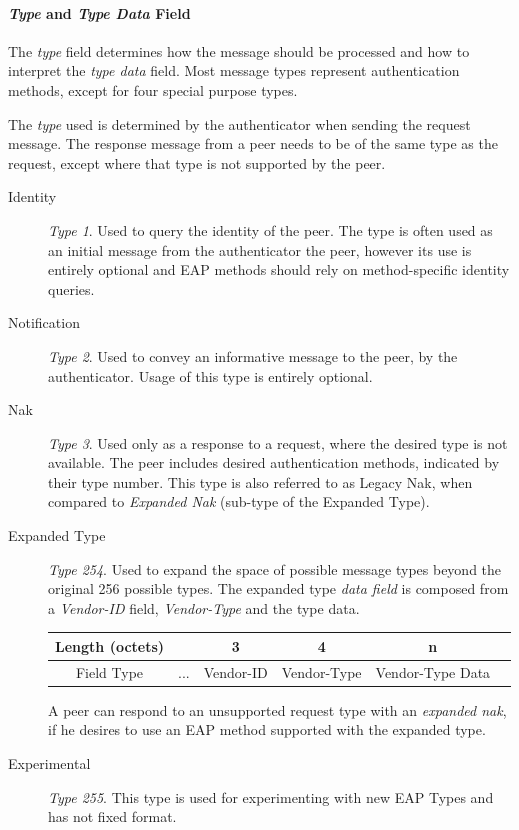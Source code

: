 \paragraph{\textit{Type} and \textit{Type Data} Field}
The \textit{type} field determines how the message should be processed and how to interpret the \textit{type data} field.
Most message types represent authentication methods, except for four special purpose types.

The \textit{type} used is determined by the authenticator when sending the request message. The response message from a peer needs to be of the same type as the request, except where that type is not supported by the peer.


\begin{description}
	\item[Identity] \textit{Type 1}. Used to query the identity of the peer. The type is often used as an initial message from the authenticator the peer, however its use is entirely optional and EAP methods should rely on method-specific identity queries.
	
	\item[Notification]\textit{Type 2}. Used to convey an informative message to the peer, by the authenticator. Usage of this type is entirely optional.
	\item[Nak]\textit{Type 3}. Used only as a response to a request, where the desired type is not available.
	The peer includes desired authentication methods, indicated by their type number.
	This type is also referred to as Legacy Nak, when compared to \textit{Expanded Nak} (sub-type of the Expanded Type).
	\item[Expanded Type] \textit{Type 254}. 
	Used to expand the space of possible message types beyond the original 256 possible types.
	The expanded type \textit{data field} is composed from a \textit{Vendor-ID} field, \textit{Vendor-Type} and the type data.
	\bigskip
	\begin{center}
		\begin{tabular}{|c|c|c|c|c|c|}
		\cline{2-5}
		\hline
		Length (octets) & & 3 & 4 & n\\
		\hline
		Field Type & ... & Vendor-ID & Vendor-Type & Vendor-Type Data\\
		\hline
		\end{tabular}
	\end{center}
	\bigskip
	A peer can respond to an unsupported request type with an \textit{expanded nak}, if he desires to use an EAP method supported with the expanded type.
	\item[Experimental] \textit{Type 255}. This type is used for experimenting with new EAP Types and has not fixed format.
\end{description}

